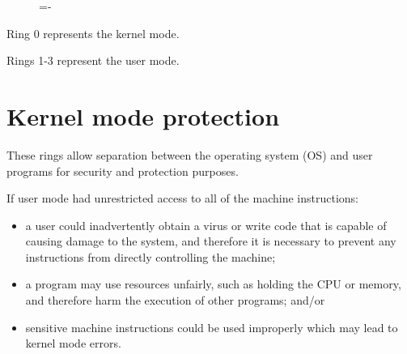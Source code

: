 \documentclass[a4paper]{systems-software}
\begin{document}
\begin{figure}[H]
  \lineskip=-\fboxrule
\end{figure}

Ring 0 represents the kernel mode.

Rings 1-3 represent the user mode.


\section*{Kernel mode protection}

These rings allow separation between the operating system (OS) and user programs for security and protection purposes.

If user mode had unrestricted access to all of the machine instructions:
\begin{itemize}
	\item a user could inadvertently obtain a virus or write code that is capable of causing damage to the system, and therefore it is necessary to prevent any instructions from directly controlling the machine;
	\item a program may use resources unfairly, such as holding the CPU or memory, and therefore harm the execution of other programs; and/or
	\item sensitive machine instructions could be used improperly which may lead to kernel mode errors.
\end{itemize}
\end{document}
